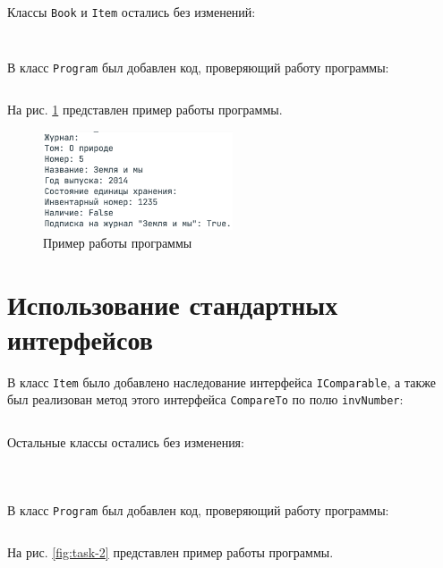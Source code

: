\documentclass[a4paper,14pt]{extarticle}
\numberwithin{figure}{section}
\begin{document}
\inputminted{csharp}{../MyClass/MyClass/Magazine.cs}

Классы \texttt{Book} и \texttt{Item} остались без изменений:

\inputminted{csharp}{../MyClass/MyClass/Book.cs}

\inputminted{csharp}{../MyClass/MyClass/Item.cs}

В класс \texttt{Program} был добавлен код, проверяющий работу программы:

\inputminted{csharp}{../MyClass/MyClass/Program.cs}

На рис. \ref{fig:task-1} представлен пример работы программы.

\begin{figure}[H]
    \centering
    \includegraphics[width=0.5\textwidth]{images/task-1.png}
    \caption{Пример работы программы}
    \label{fig:task-1}
\end{figure}

\section{Использование стандартных интерфейсов}

В класс \texttt{Item} было добавлено наследование интерфейса \texttt{IComparable}, а также был реализован метод этого интерфейса \texttt{CompareTo} по полю \texttt{invNumber}:

\inputminted{csharp}{../MyClass1/MyClass/Item.cs}

Остальные классы остались без изменения:

\inputminted{csharp}{../MyClass1/MyClass/IPubs.cs}

\inputminted{csharp}{../MyClass1/MyClass/Book.cs}

\inputminted{csharp}{../MyClass1/MyClass/Magazine.cs}

В класс \texttt{Program} был добавлен код, проверяющий работу программы:

\inputminted{csharp}{../MyClass1/MyClass/Program.cs}

На рис. \ref{fig:task-2} представлен пример работы программы.
\end{document}
